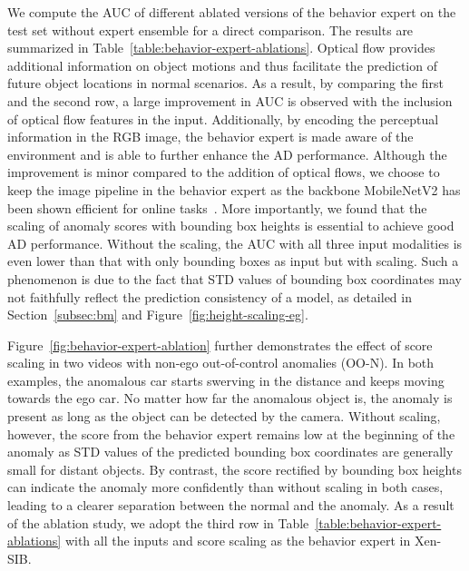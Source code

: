 We compute the AUC of different ablated versions of the behavior expert on the test set without expert ensemble for a direct comparison. The results are summarized in Table~\ref{table:behavior-expert-ablations}. Optical flow provides additional information on object motions and thus facilitate the prediction of future object locations in normal scenarios. As a result, by comparing the first and the second row, a large improvement in AUC is observed with the inclusion of optical flow features in the input. Additionally, by encoding the perceptual information in the RGB image, the behavior expert is made aware of the environment and is able to further enhance the AD performance. Although the improvement is minor compared to the addition of optical flows, we choose to keep the image pipeline in the behavior expert as the backbone MobileNetV2 has been shown efficient for online tasks~\citep{orsic2019defense}. More importantly, we found that the scaling of anomaly scores with bounding box heights is essential to achieve good AD performance. Without the scaling, the AUC with all three input modalities is even lower than that with only bounding boxes as input but with scaling. Such a phenomenon is due to the fact that STD values of bounding box coordinates may not faithfully reflect the prediction consistency of a model, as detailed in Section~\ref{subsec:bm} and Figure~\ref{fig:height-scaling-eg}.

Figure~\ref{fig:behavior-expert-ablation} further demonstrates the effect of score scaling in two videos with non-ego out-of-control anomalies (OO-N). In both examples, the anomalous car starts swerving in the distance and keeps moving towards the ego car. No matter how far the anomalous object is, the anomaly is present as long as the object can be detected by the camera. Without scaling, however, the score from the behavior expert remains low at the beginning of the anomaly as STD values of the predicted bounding box coordinates are generally small for distant objects. By contrast, the score rectified by bounding box heights can indicate the anomaly more confidently than without scaling in both cases, leading to a clearer separation between the normal and the anomaly. As a result of the ablation study, we adopt the third row in Table~\ref{table:behavior-expert-ablations} with all the inputs and score scaling as the behavior expert in Xen-SIB.


